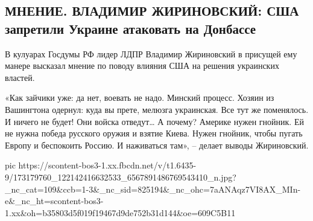  
 
 
 
 
\subsection{МНЕНИЕ. ВЛАДИМИР ЖИРИНОВСКИЙ:  США запретили Украине атаковать на Донбассе}

В кулуарах Госдумы РФ лидер ЛДПР Владимир Жириновский в присущей ему манере
высказал мнение по поводу влияния США на решения украинских властей.

«Как зайчики уже: да нет, воевать не надо. Минский процесс. Хозяин из
Вашингтона одернул: куда вы прете, мелюзга украинская. Все тут же поменялось. И
ничего не будет! Они войска отведут… А почему? Америке нужен гнойник. Ей не
нужна победа русского оружия и взятие Киева. Нужен гнойник, чтобы пугать Европу
и беспокоить Россию. И наживаться там», – делает выводы Жириновский.

\ifcmt
  pic https://scontent-bos3-1.xx.fbcdn.net/v/t1.6435-9/173179760_122142416632533_6567891486769543410_n.jpg?_nc_cat=109&ccb=1-3&_nc_sid=825194&_nc_ohc=7aANAqz7VI8AX_MIn-e&_nc_ht=scontent-bos3-1.xx&oh=b35803d5f019f19467d9de752b31d144&oe=609C5B11
\fi

